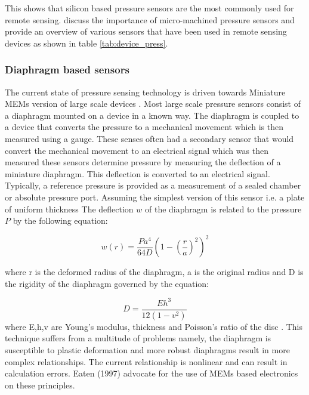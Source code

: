 This shows that silicon based pressure sensors are the most commonly used for remote sensing.\textcite{eaton1997micromachined} discuss the importance of micro-machined pressure sensors and provide an overview of various sensors that have been used in remote sensing devices as shown in table \ref{tab:device_press}.
\subsubsection{Diaphragm based sensors}

The current state of pressure sensing technology is driven towards Miniature MEMs version of large scale devices \cite{eaton1997micromachined}. Most large scale pressure sensors consist of a diaphragm mounted on a device in a known way. The diaphragm is coupled to a device that converts the pressure to a mechanical movement which is then measured using a gauge. These senses often had a secondary sensor that would convert the mechanical movement to an electrical signal which was then measured \cite{eaton1997micromachined} these sensors determine pressure by measuring the deflection of a miniature diaphragm. This deflection is converted to an electrical signal. Typically, a reference pressure is provided as a measurement of a sealed chamber or absolute pressure port. Assuming the simplest version of this sensor i.e. a plate of uniform thickness \cite{eaton1997micromachined} The deflection $w$ of the diaphragm is related to the pressure  $P$ by the following equation: \cite{eaton1997micromachined}

\begin{equation}
	w(r) = \frac{Pa^4}{64D}(1- (\frac{r}{a})^2)^2
\end{equation}

where r is the deformed radius of the diaphragm, a is the original radius and D is the  rigidity of the diaphragm governed by the equation:

\begin{equation}
	D = \frac{Eh^3}{12(1-v^2)}
\end{equation}
where E,h,v are Young's modulus, thickness and Poisson's ratio of the disc \cite{eaton1997micromachined}. This technique suffers from a multitude of problems namely, the diaphragm is susceptible to plastic deformation and more robust diaphragms result in more complex relationships. The current relationship is nonlinear and can result in calculation errors. Eaten (1997) advocate for the use of MEMs based electronics on these principles.

